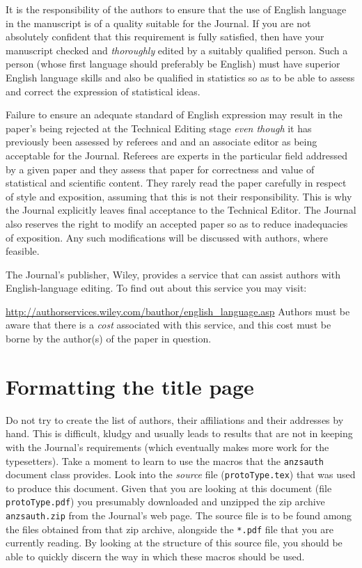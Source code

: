 \documentclass[times, doublespace]{anzsauth}
\begin{document}
It is the responsibility of the authors to ensure that the use
of English language in the manuscript is of a quality suitable
for the Journal. If you are not absolutely confident that this
requirement is fully satisfied, then have your manuscript checked
and \emph{thoroughly} edited by a suitably qualified person.
Such a person (whose first language should preferably be English)
must have superior English language skills and also be qualified
in statistics so as to be able to assess and correct the expression
of statistical ideas.

Failure to ensure an adequate standard of English expression may
result in the paper's being rejected at the Technical Editing stage
\emph{even though} it has previously been assessed by referees
and and an associate editor as being acceptable for the Journal.
Referees are experts in the particular field addressed by a given
paper and they assess that paper for correctness and value of
statistical and scientific content. They rarely read the paper
carefully in respect of style and exposition, assuming that this is
not their responsibility.  This is why the Journal explicitly leaves
final acceptance to the Technical Editor.  The Journal also reserves
the right to modify an accepted paper so as to reduce inadequacies of
exposition.  Any such modifications will be discussed with authors,
where feasible.

The Journal's publisher, Wiley, provides a service that can assist
authors with English-language editing.  To find out about this
service you may visit:

{\small
\url{http://authorservices.wiley.com/bauthor/english_language.asp}
}
\noindent
Authors must be aware that there is a \emph{cost} associated with
this service, and this cost must be borne by the author(s) of the
paper in question.

\section{Formatting the title page}
\label{sec:titPage}

Do not try to create the list of authors, their affiliations
and their addresses by hand.  This is difficult, kludgy and
usually leads to results that are not in keeping with the
Journal's requirements (which eventually makes more work for
the typesetters).  Take a moment to learn to use the macros
that the \texttt{anzsauth} document class provides.  Look into
the \emph{source} file (\texttt{protoType.tex}) that was used to
produce this document.  Given that you are looking at this document
(file \texttt{protoType.pdf}) you presumably downloaded and unzipped
the zip archive \texttt{anzsauth.zip} from the Journal's web page.
The source file is to be found among the files obtained from
that zip archive, alongside the \texttt{*.pdf} file that you are
currently reading.  By looking at the structure of this source file,
you should be able to quickly discern the way in which these macros
should be used.
\end{document}
